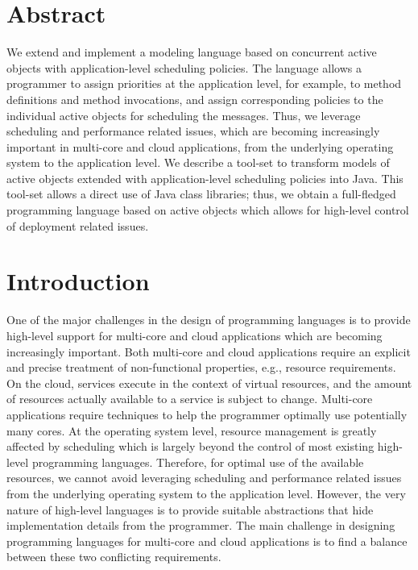 \section*{Abstract}
We extend and implement a modeling language based on concurrent active objects with application-level
scheduling policies.
The language allows a programmer to assign priorities at the application level, for example,
to method definitions and method invocations, and assign corresponding  policies to the individual active objects
for scheduling the messages.
Thus, we   leverage scheduling and performance related issues,
which are becoming increasingly important in multi-core and cloud  applications, from the underlying operating system to the application level.
We describe a tool-set to transform models of active objects extended with application-level
scheduling policies  into Java.
This tool-set allows a direct  use of Java class libraries; thus,  we
obtain  a full-fledged programming language
based on active objects which allows for high-level control of deployment related issues.


\section{Introduction} \label{sec:introduction}
One of the major challenges in the design of programming
languages is to provide high-level support for  multi-core and cloud  applications which are becoming increasingly important.
Both multi-core and cloud  applications require an explicit and precise treatment of non-functional properties, e.g., resource requirements.
On the cloud, services execute in the
context of virtual resources, and the amount of resources actually available to a service is subject to change.
Multi-core applications require techniques 
to help the programmer optimally use potentially many cores. At
the operating system level, resource management is greatly affected by scheduling which
is largely beyond the control of most existing high-level programming languages.
Therefore, for optimal use of the available resources, we cannot avoid leveraging
scheduling and performance related issues from the underlying operating system
to the application level. However, the very nature of high-level languages is to
provide suitable abstractions that hide
implementation details from the programmer. The main challenge in designing programming languages
for  multi-core and cloud  applications
is to find a balance between these two conflicting requirements.

